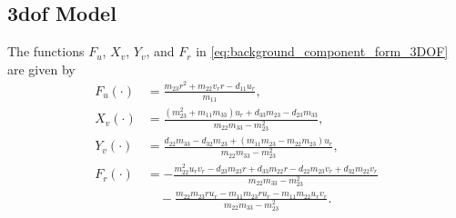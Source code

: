 \subsection{3\gls{dof} Model}
The functions $F_u$, $X_v$, $Y_v$, and $F_r$ in \eqref{eq:background_component_form_3DOF} are given by
\begin{subequations}
    \begin{align}
        F_u(\cdot) &= \frac{m_{23}r^2+m_{22}v_{r}r-d_{11}u_{r}}{m_{11}}, \\
        X_v(\cdot) &= \frac{(m_{23}^2 + m_{11}m_{33})u_{r}+d_{33}m_{23}-d_{23}m_{33}}{m_{22}m_{33}-m_{23}^2}, \\
        Y_v(\cdot) &= \frac{d_{22}m_{33}-d_{32}m_{23}+(m_{11}m_{23}-m_{22}m_{23})u_{r}}{m_{22}m_{33}-m_{23}^2}, \\
        F_r(\cdot) &= -\frac{m_{22}^2u_{r}v_{r}-d_{23}m_{23}r+d_{33}m_{22}r-d_{22}m_{23}v_{r}+d_{32}m_{22}v_{r}}{m_{22}m_{33}-m_{23}^2} \\
        &\quad - \frac{m_{22}m_{23}ru_{r}-m_{11}m_{23}ru_{r}-m_{11}m_{22}u_{r}v_{r}}{m_{22}m_{33}-m_{23}^2}. \nonumber
    \end{align}
\end{subequations}